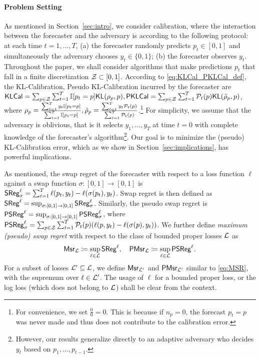 \paragraph{Problem Setting}
As mentioned in Section~\ref{sec:intro}, we consider calibration, where the interaction between the forecaster and the adversary is according to the following protocol: at each time $t=1, \ldots, T$, (a) the forecaster randomly predicts $p_{t} \in [0, 1]$ and simultaneously the adversary chooses $y_{t} \in \{0, 1\}$; (b) the forecaster observes $y_{t}$. Throughout the paper, we shall consider algorithms that make predictions $p_{t}$ that fall in a finite discretization $\mathcal{Z} \subset [0, 1]$.
According to \eqref{eq:KLCal_PKLCal_def}, the KL-Calibration, Pseudo KL-Calibration incurred by the forecaster are  $\mathsf{KLCal} = \sum_{p \in \mathcal{Z}} \sum_{t = 1} ^ {T} \mathbb{I}{\left[p_{t} = p\right]} \mathsf{KL}(\rho_{p}, p), \mathsf{PKLCal} = \sum_{p \in \mathcal{Z}} \sum_{t = 1} ^ {T} \mathcal{P}_{t}(p)\mathsf{KL}(\tilde{\rho}_{p}, p)$, where 
$\rho_{p} = \frac{\sum_{t = 1} ^ {T} y_{t} \mathbb{I}{\left[p_{t} = p\right]}}{\sum_{t = 1} ^ {T} \mathbb{I}{\left[p_{t} = p\right]}}, \tilde{\rho}_{p} = \frac{\sum_{t = 1} ^ {T} y_{t} \mathcal{P}_{t}(p)}{\sum_{t = 1} ^ {T} \mathcal{P}_{t}(p)}$.\footnote{
For convenience, we set $\frac{0}{0} = 0$. This is because if $n_{p} = 0$, the forecast $p_{t} = p$ was never made and thus does not contribute to the calibration error.}  For simplicity, we assume that the adversary is oblivious, that is it selects $y_{1}, \dots, y_{T}$ at time $t = 0$ with complete knowledge of the forecaster's algorithm\footnote{However, our results generalize directly to an adaptive adversary who decides $y_t$ based on $p_1,\ldots, p_{t-1}$.}. Our goal is to minimize the (pseudo) KL-Calibration error, which as we show in Section~\ref{sec:implications}, has powerful implications.


As mentioned, the swap regret of the forecaster with respect to a loss function $\ell$ against a swap function $\sigma: [0, 1] \to [0, 1]$ is $\mathsf{SReg}^{\ell}_\sigma = \sum_{t = 1} ^ {T} \ell(p_{t}, y_{t}) - \ell(\sigma(p_{t}), y_{t})$. Swap regret is then defined as $\mathsf{SReg} ^ {\ell} = \sup_{\sigma: [0, 1] \to [0, 1]} \mathsf{SReg}^{\ell}_{\sigma}$. Similarly, the pseudo swap regret is $\mathsf{PSReg}^{\ell} = \sup_{\sigma: [0, 1] \to [0, 1]} \mathsf{PSReg}^{\ell}_{\sigma}$, where $\mathsf{PSReg}_{\sigma}^{\ell} = \sum_{p \in \mathcal{Z}} \sum_{t = 1} ^ {T} \mathcal{P}_{t}(p) (\ell(p, y_{t}) - \ell(\sigma(p), y_{t}))$. 
We further define \textit{maximum (pseudo) swap regret} with respect to the class of bounded proper losses $\mathcal{L}$ as \begin{align}\label{eq:MSR}
    \mathsf{Msr}_{\mathcal{L}} \coloneqq \sup_{\ell \in \mathcal{L}} \mathsf{SReg}^{\ell}, \quad \mathsf{PMsr}_{\mathcal{L}}  \coloneqq \sup_{\ell \in \mathcal{L}} \mathsf{PSReg}^{\ell}.
\end{align}
For a subset of losses $\mathcal{L}' \subseteq \mathcal{L}$, we define $\mathsf{Msr}_{\mathcal{L}'}$ and $\mathsf{PMsr}_{\mathcal{L}'}$ similar to \eqref{eq:MSR}, with the supremum over $\ell \in \mathcal{L}'$. The usage of $\ell$ for a bounded proper loss, or the log loss (which does not belong to $\mathcal{L}$) shall be clear from the context.
 